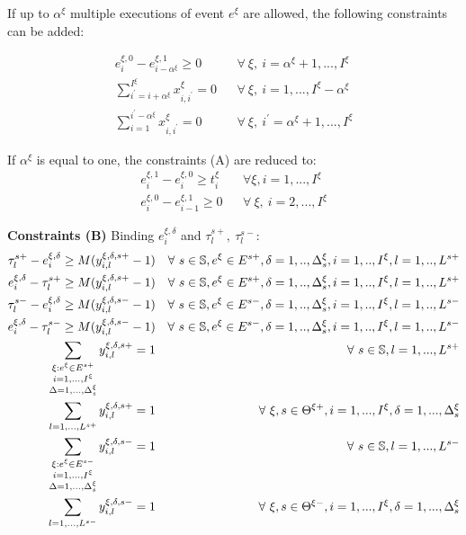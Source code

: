 \documentclass[]{interact}
\theoremstyle{plain}%
\theoremstyle{definition}
\theoremstyle{remark}
\begin{document}
If up to $\alpha^{\xi}$ multiple executions of event $e^{\xi}$ are allowed, the following constraints can be added:

\begin{eqnarray}
e^{\xi,0}_{i} - e^{\xi,1}_{i-\alpha^{\xi}} \ge 0 && \forall\ \xi,\ i=\alpha^{\xi}+1,...,I^{\xi} \\
\sum_{i^{'}=i+\alpha^{\xi}}^{I^{\xi}} x^{\xi}_{i,i^{'}}=0&& \forall\ \xi,\ i=1,...,I^{\xi}-\alpha^{\xi}\\
\sum_{i=1}^{i^{'}-\alpha^{\xi}} x^{\xi}_{i,i^{'}}=0&&\forall\ \xi,\ i^{'}=\alpha^{\xi}+1, ..., I^{\xi}
\end{eqnarray}

If $\alpha^{\xi}$ is equal to one, the constraints (A) are reduced to:
\begin{eqnarray}
e^{\xi,1}_{i} - e^{\xi,0}_{i} \ge t^{\xi}_{i} && \forall \xi, i=1,...,I^{\xi}\\
e^{\xi,0}_{i} - e^{\xi,1}_{i-1} \ge 0&& \forall\ \xi,\ i=2,...,I^{\xi} 
\end{eqnarray}

\textbf{Constraints (B)} Binding $e^{\xi,\delta}_i$ and $\tau^{s+}_l,\ \tau^{s-}_l$:
\begin{eqnarray}
\tau^{s+}_l - e^{\xi,\delta}_i \ge M(y^{\xi,\delta,s+}_{i,l}-1)&&\forall\ s\in \mathbb{S},e^{\xi}\in E^{s+},\delta=1,..,\Delta^{\xi}_s,i=1,..,I^{\xi},l=1,..,L^{s+} \\
e^{\xi,\delta}_i - \tau^{s+}_l \ge M(y^{\xi,\delta,s+}_{i,l}-1)&&\forall\ s\in \mathbb{S},e^{\xi}\in E^{s+},\delta=1,..,\Delta^{\xi}_s,i=1,..,I^{\xi},l=1,..,L^{s+}\\
\tau^{s-}_l - e^{\xi,\delta}_i \ge M(y^{\xi,\delta,s-}_{i,l}-1)&&\forall\ s\in \mathbb{S},e^{\xi}\in E^{s-},\delta=1,..,\Delta^{\xi}_s,i=1,..,I^{\xi},l=1,..,L^{s-}\\
e^{\xi,\delta}_i - \tau^{s-}_l \ge M(y^{\xi,\delta,s-}_{i,l}-1)&&\forall\ s\in \mathbb{S},e^{\xi}\in E^{s-},\delta=1,..,\Delta^{\xi}_s,i=1,..,I^{\xi},l=1,..,L^{s-}\\
\sum_{\begin{subarray}{c} \xi:e^{\xi}\in E^{s+} \\ i=1,...,I^{\xi}\\\Delta=1,..., \Delta^{\xi}_s\end{subarray}} y^{\xi,\delta,s+}_{i,l}=1&& \forall\ s\in \mathbb{S},l=1,...,L^{s+}\\
\sum_{l=1,...,L^{s+}} y^{\xi,\delta,s+}_{i,l}=1&&\forall\ \xi,s\in \Theta^{\xi+},i=1,...,I^{\xi},\delta=1,...,\Delta^{\xi}_{s}\\
\sum_{\begin{subarray}{c} \xi:e^{\xi}\in E^{s-} \\ i=1,...,I^{\xi}\\\Delta=1,..., \Delta^{\xi}_s\end{subarray}} y^{\xi,\delta,s-}_{i,l}=1&& \forall\ s\in \mathbb{S},l=1,...,L^{s-}\\
\sum_{l=1,...,L^{s-}} y^{\xi,\delta,s-}_{i,l}=1&&\forall\ \xi, s\in \Theta^{\xi-}, i=1,...,I^{\xi},\delta=1,...,\Delta^{\xi}_{s}\\
\end{eqnarray}
\end{document}
